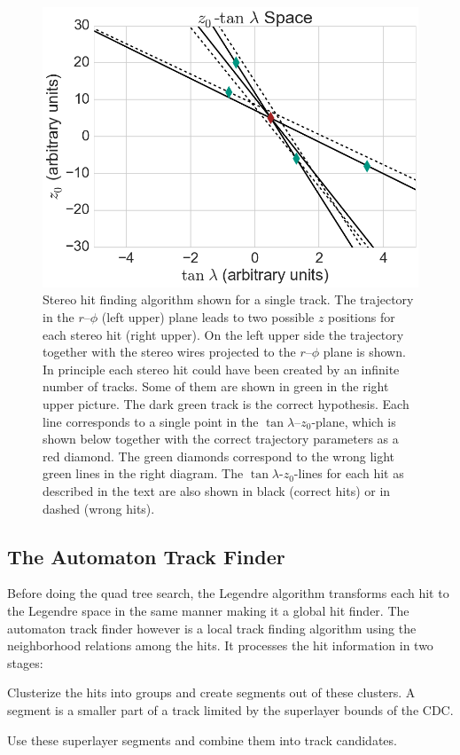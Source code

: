 \begin{figure}
 \vspace*{1cm}
 \includegraphics[scale=0.3]{figures/theory/stereo_3.png}
 \caption[Stereo Legendre algorithm.]{Stereo hit finding algorithm shown for a single track. The trajectory in the $r$--$\phi$ (left upper) plane leads to two possible $z$ positions for each stereo hit (right upper). On the left upper side the trajectory together with the stereo wires projected to the $r$--$\phi$ plane is shown. In principle each stereo hit could have been created by an infinite number of tracks. Some of them are shown in green in the right upper picture. The dark green track is the correct hypothesis. Each line corresponds to a single point in the $\tan \lambda$--$z_0$-plane, which is shown below together with the correct trajectory parameters as a red diamond. The green diamonds correspond to the wrong light green lines in the right diagram. The $\tan \lambda$-$z_0$-lines for each hit as described in the text are also shown in black (correct hits) or in dashed (wrong hits).}
 \label{fig-stereo-explained}
\end{figure}


\subsection{The Automaton Track Finder}
Before doing the quad tree search, the Legendre algorithm transforms each hit to the Legendre space in the same manner making it a global hit finder. The automaton track finder however is a local track finding algorithm using the neighborhood relations among the hits. It processes the hit information in two stages:
\begin{zlist}
  \item Clusterize the hits into groups and create segments out of these clusters. A segment is a smaller part of a track limited by the superlayer bounds of the CDC.
  \item Use these superlayer segments and combine them into track candidates.
\end{zlist}

